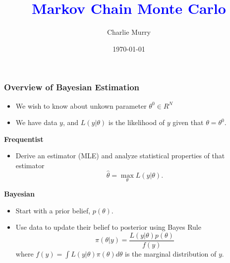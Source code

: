 \documentclass[11pt, aspectratio=169]{beamer}
\title[]{\textcolor{blue}{Markov Chain Monte Carlo}}
\author[CM]{Charlie Murry}
\institute{Boston College}
\date{\today}
\begin{document}

\begin{frame}
\maketitle
\end{frame}


\begin{frame}[c]\frametitle{Overview of Bayesian Estimation}
    
\begin{itemize}
    \item We wish to know about unkown parameter $\theta^0\in R^N$
    \item We have data $y$, and $L(y|\theta)$ is the likelihood of $y$ given that $\theta = \theta^0$. 
\end{itemize}    

\textbf{Frequentist}
\begin{itemize}
	\item Derive an estimator (MLE) and analyze statistical properties of that estimator
	$$ \hat{\theta} = \max_{\theta} L(y | \theta).$$
\end{itemize}

\textbf{Bayesian}
\begin{itemize}
	\item Start with a prior belief, $p(\theta)$.
	\item Use data to update their belief  to posterior using Bayes Rule
	$$\pi(\theta | y) = \frac{L(y | \theta) p(\theta)}{f(y)}$$ 
where $f(y) = \int L(y|\theta)\pi(\theta) d\theta$ is the marginal distribution of $y$. 

\end{itemize}

\end{frame}
\end{document}
